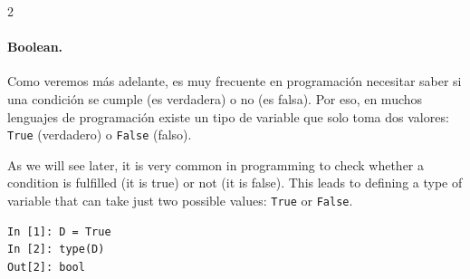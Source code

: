 \begin{paracol}{2}
\paragraph{Boolean.} Como veremos más adelante, es muy frecuente en programación necesitar saber si una condición se cumple (es verdadera) o no (es falsa). Por eso, en muchos lenguajes de programación existe un tipo de variable que solo toma dos valores: \texttt{True} (verdadero)  o \texttt{False} (falso).

\switchcolumn
As we will see later, it is very common in programming to check whether a condition is fulfilled (it is true) or not (it is false). This leads to defining a type of variable that can take just two possible values:  \texttt{True} or \texttt{False}. 
\end{paracol}
\begin{center}
    \begin{minipage}{0.2\textwidth}
\begin{verbatim}
In [1]: D = True
In [2]: type(D)
Out[2]: bool
\end{verbatim}
\end{minipage}\end{center}

